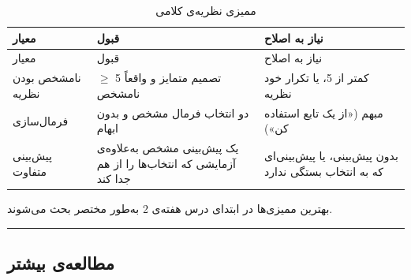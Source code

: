 \begin{longtable}[]{@{}
  >{\raggedright\arraybackslash}p{}
  >{\raggedright\arraybackslash}p{}
  >{\raggedright\arraybackslash}p{}@{}}
\caption{\centering {}ممیزی نظریه‌ی کلامی}\tabularnewline
\toprule\noalign{}
\begin{minipage}[b]{\linewidth}\raggedright
معیار
\end{minipage} & \begin{minipage}[b]{\linewidth}\raggedright
قبول
\end{minipage} & \begin{minipage}[b]{\linewidth}\raggedright
نیاز به اصلاح
\end{minipage} \\
\midrule\noalign{}
\endfirsthead
\toprule\noalign{}
\begin{minipage}[b]{\linewidth}\raggedright
معیار
\end{minipage} & \begin{minipage}[b]{\linewidth}\raggedright
قبول
\end{minipage} & \begin{minipage}[b]{\linewidth}\raggedright
نیاز به اصلاح
\end{minipage} \\
\midrule\noalign{}
\endhead
\bottomrule\noalign{}
\endlastfoot
نامشخص بودن نظریه & \ensuremath{\geq} 5 تصمیم متمایز و واقعاً نامشخص & کمتر از 5، یا
تکرار خود نظریه \\
فرمال‌سازی & دو انتخاب فرمال مشخص و بدون ابهام & مبهم («از یک تابع
استفاده کن») \\
پیش‌بینی متفاوت & یک پیش‌بینی مشخص به‌علاوه‌ی آزمایشی که انتخاب‌ها را از هم
جدا کند & بدون پیش‌بینی، یا پیش‌بینی‌ای که به انتخاب بستگی ندارد \\
\end{longtable}

بهترین ممیزی‌ها در ابتدای درس هفته‌ی 2 به‌طور مختصر بحث می‌شوند.

\begin{center}\rule{0.5\linewidth}{0.5pt}\end{center}

\subsection{مطالعه‌ی بیشتر}


